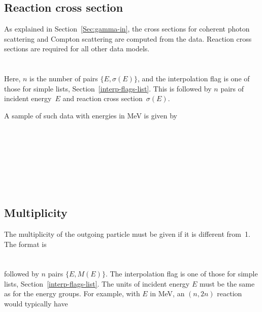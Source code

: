 \subsection{Reaction cross section}
As explained in Section~\ref{Sec:gamma-in}, the cross sections for coherent photon
scattering and Compton scattering are computed from the data.
Reaction cross sections are required for all other data models.\\
  \\
  \\
Here, $n$ is the number of pairs $\{E, \sigma(E)\}$,
and the interpolation flag is one of those for simple lists,
Section~\ref{interp-flags-list}.  This is
followed by $n$ pairs of incident energy~$E$ and reaction cross
section~$\sigma( E )$.

A sample of such data with energies in MeV is given by\\
 \\
 \\
  \\
  \\
  \\
  \\
  \Input{  \indent }{ $\cdots$}\\

\subsection{Multiplicity}
The multiplicity of the outgoing particle must be given if it is
different from~1.  The format is\\
  \\
  \\
followed by $n$ pairs $\{E, M(E)\}$.  
The interpolation flag is one of those for simple lists,
Section~\ref{interp-flags-list}.  The units of incident energy
$E$ must be the same as for the energy groups.  
For example, with $E$ in MeV, an $(n, 2n)$ reaction
would typically have\\
  \\
  \\
  \\


